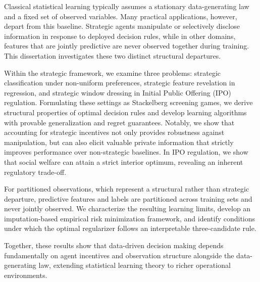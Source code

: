 Classical statistical learning typically assumes a stationary data-generating law and a fixed set of observed variables. Many practical applications, however, depart from this baseline. Strategic agents manipulate or selectively disclose information in response to deployed decision rules, while in other domains, features that are jointly predictive are never observed together during training. This dissertation investigates these two distinct structural departures.

Within the strategic framework, we examine three problems: strategic classification under non-uniform preferences, strategic feature revelation in regression, and strategic window dressing in Initial Public Offering (IPO) regulation. Formulating these settings as Stackelberg screening games, we derive structural properties of optimal decision rules and develop learning algorithms with provable generalization and regret guarantees. Notably, we show that accounting for strategic incentives not only provides robustness against manipulation, but can also elicit valuable private information that strictly improves performance over non-strategic baselines. In IPO regulation, we show that social welfare can attain a strict interior optimum, revealing an inherent regulatory trade-off.

For partitioned observations, which represent a structural rather than strategic departure, predictive features and labels are partitioned across training sets and never jointly observed. We characterize the resulting learning limits, develop an imputation-based empirical risk minimization framework, and identify conditions under which the optimal regularizer follows an interpretable three-candidate rule.

Together, these results show that data-driven decision making depends fundamentally on agent incentives and observation structure alongside the data-generating law, extending statistical learning theory to richer operational environments.